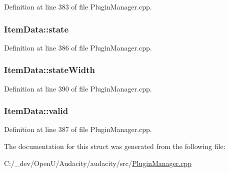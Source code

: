 Definition at line 383 of file Plugin\+Manager.\+cpp.

\subsubsection[{\texorpdfstring{state}{state}}]{ Item\+Data\+::state}\hypertarget{struct_item_data_aeba3a1cbadc777d743f820b7c1d98905}{}\label{struct_item_data_aeba3a1cbadc777d743f820b7c1d98905}


Definition at line 386 of file Plugin\+Manager.\+cpp.

\subsubsection[{\texorpdfstring{state\+Width}{stateWidth}}]{ Item\+Data\+::state\+Width}\hypertarget{struct_item_data_a7ae753decf5c72933e702b4f00bc05d8}{}\label{struct_item_data_a7ae753decf5c72933e702b4f00bc05d8}


Definition at line 390 of file Plugin\+Manager.\+cpp.

\subsubsection[{\texorpdfstring{valid}{valid}}]{ Item\+Data\+::valid}\hypertarget{struct_item_data_afcd2975b9c223498a200b25fdf772868}{}\label{struct_item_data_afcd2975b9c223498a200b25fdf772868}


Definition at line 387 of file Plugin\+Manager.\+cpp.



The documentation for this struct was generated from the following file\+:\begin{DoxyCompactItemize}
\item 
C\+:/\+\_\+dev/\+Open\+U/\+Audacity/audacity/src/\hyperlink{_plugin_manager_8cpp}{Plugin\+Manager.\+cpp}\end{DoxyCompactItemize}
